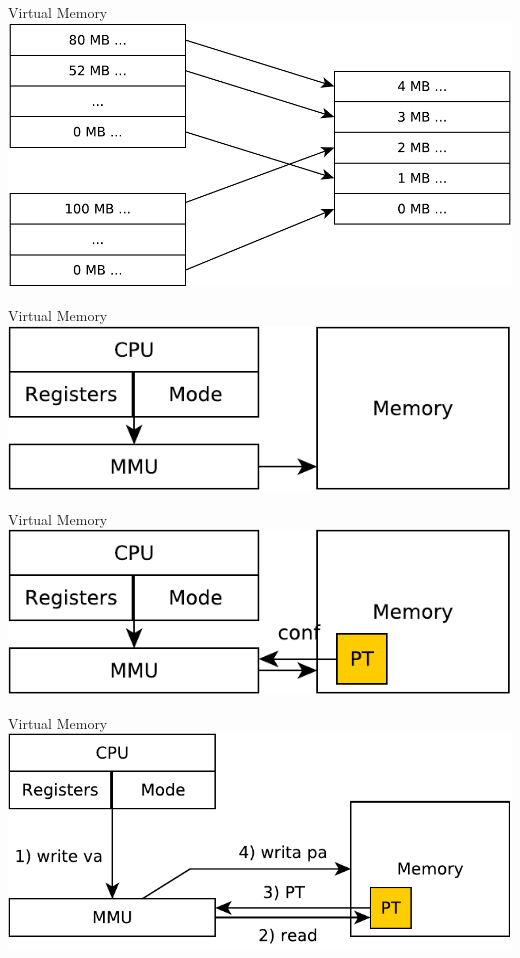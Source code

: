 \documentclass{beamer}
\begin{document}
\begin{frame}{Virtual Memory}
  \includegraphics[width=0.8\linewidth]{va2pa}
\end{frame}

\begin{frame}{Virtual Memory}
  \includegraphics[width=0.8\linewidth]{hw2}
\end{frame}

\begin{frame}{Virtual Memory}
  \includegraphics[width=0.8\linewidth]{hw3}
\end{frame}

\begin{frame}{Virtual Memory}
  \includegraphics[width=0.8\linewidth]{hw4}
\end{frame}
\end{document}
